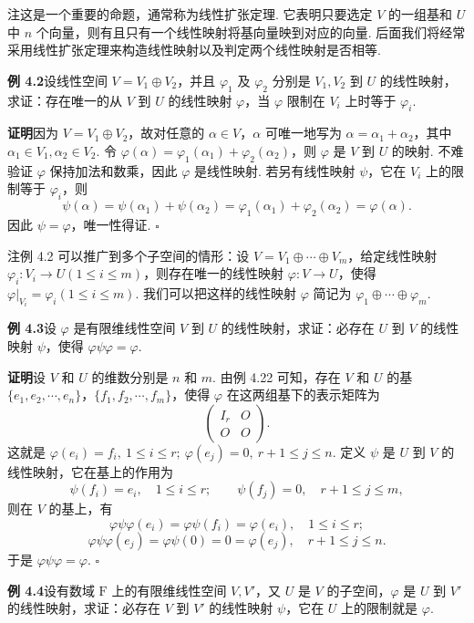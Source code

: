 \documentclass[UTF8, 12pt, fontset=fandol, oneside]{ctexart}
\begin{document}
注\quad 这是一个重要的命题，通常称为线性扩张定理. 它表明只要选定 $V$ 的一组基和 $U$ 中 $n$ 个向量，则有且只有一个线性映射将基向量映到对应的向量. 后面我们将经常采用线性扩张定理来构造线性映射以及判定两个线性映射是否相等.

\noindent\textbf{例 4.2}\quad 设线性空间 $V=V_1\oplus V_2$，并且 $\varphi_1$ 及 $\varphi_2$ 分别是 $V_1,V_2$ 到 $U$ 的线性映射，求证：存在唯一的从 $V$ 到 $U$ 的线性映射 $\varphi$，当 $\varphi$ 限制在 $V_i$ 上时等于 $\varphi_i$.

\noindent\textbf{证明}\quad 因为 $V=V_1\oplus V_2$，故对任意的 $\alpha\in V$，$\alpha$ 可唯一地写为 $\alpha=\alpha_1+\alpha_2$，其中 $\alpha_1\in V_1,\alpha_2\in V_2$. 令 $\varphi(\alpha)=\varphi_1(\alpha_1)+\varphi_2(\alpha_2)$，则 $\varphi$ 是 $V$ 到 $U$ 的映射. 不难验证 $\varphi$ 保持加法和数乘，因此 $\varphi$ 是线性映射. 若另有线性映射 $\psi$，它在 $V_i$ 上的限制等于 $\varphi_i$，则
\[
\psi(\alpha)=\psi(\alpha_1)+\psi(\alpha_2)=\varphi_1(\alpha_1)+\varphi_2(\alpha_2)=\varphi(\alpha).
\]
因此 $\psi=\varphi$，唯一性得证. $\square$

注\quad 例 4.2 可以推广到多个子空间的情形：设 $V=V_1\oplus\cdots\oplus V_m$，给定线性映射 $\varphi_i:V_i\to U(1\le i\le m)$，则存在唯一的线性映射 $\varphi:V\to U$，使得 $\varphi|_{V_i}=\varphi_i(1\le i\le m)$. 我们可以把这样的线性映射 $\varphi$ 简记为 $\varphi_1\oplus\cdots\oplus\varphi_m$.

\noindent\textbf{例 4.3}\quad 设 $\varphi$ 是有限维线性空间 $V$ 到 $U$ 的线性映射，求证：必存在 $U$ 到 $V$ 的线性映射 $\psi$，使得 $\varphi\psi\varphi=\varphi$.

\noindent\textbf{证明}\quad 设 $V$ 和 $U$ 的维数分别是 $n$ 和 $m$. 由例 4.22 可知，存在 $V$ 和 $U$ 的基 $\{e_1,e_2,\cdots,e_n\}$，$\{f_1,f_2,\cdots,f_m\}$，使得 $\varphi$ 在这两组基下的表示矩阵为
\[
\left(\begin{array}{cc}
I_r & O\\
O & O
\end{array}\right).
\]
这就是 $\varphi(e_i)=f_i,\ 1\le i\le r;\ \varphi(e_j)=0,\ r+1\le j\le n$. 定义 $\psi$ 是 $U$ 到 $V$ 的线性映射，它在基上的作用为
\[
\psi(f_i)=e_i,\quad 1\le i\le r;\qquad \psi(f_j)=0,\quad r+1\le j\le m,
\]
则在 $V$ 的基上，有
\[
\varphi\psi\varphi(e_i)=\varphi\psi(f_i)=\varphi(e_i),\quad 1\le i\le r;
\]
\[
\varphi\psi\varphi(e_j)=\varphi\psi(0)=0=\varphi(e_j),\quad r+1\le j\le n.
\]
于是 $\varphi\psi\varphi=\varphi$. $\square$

\noindent\textbf{例 4.4}\quad 设有数域 $\mathrm{F}$ 上的有限维线性空间 $V,V'$，又 $U$ 是 $V$ 的子空间，$\varphi$ 是 $U$ 到 $V'$ 的线性映射，求证：必存在 $V$ 到 $V'$ 的线性映射 $\psi$，它在 $U$ 上的限制就是 $\varphi$.
\end{document}
